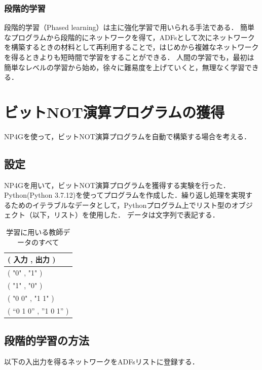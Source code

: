 \documentclass[exploratorypaper]{jsaiart} %
\begin{document}
\subsubsection{段階的学習}
段階的学習（Phased learning）は主に強化学習で用いられる手法である\cite{hodohara2012reinforcement}．
簡単なプログラムから段階的にネットワークを得て，ADFsとして次にネットワークを構築するときの材料として再利用することで，はじめから複雑なネットワークを得るときよりも短時間で学習をすることができる．
人間の学習でも，最初は簡単なレベルの学習から始め，徐々に難易度を上げていくと，無理なく学習できる．

\section{ビットNOT演算プログラムの獲得}
NP4Gを使って，ビットNOT演算プログラムを自動で構築する場合を考える．

\subsection{設定}
NP4Gを用いて，ビットNOT演算プログラムを獲得する実験を行った．
Python(Python 3.7.12)を使ってプログラムを作成した．繰り返し処理を実現するためのイテラブルなデータとして，Pythonプログラム上でリスト型のオブジェクト（以下，リスト）を使用した．
データは文字列で表記する．

\begin{table}[htbp]
\centering
\caption{学習に用いる教師データのすべて}
\label{tbl:result}
\begin{tabular}{l}
    \hline
     ( 入力 , 出力 ) \\
    \hline \hline
    ( "0" , "1" ) \\
    ( "1" , "0" ) \\
    ( "0 0" , "1 1" ) \\
    ( “0 1 0” , ”1 0 1” ) \\
    \hline
\end{tabular}
\end{table}

\subsection{段階的学習の方法}
以下の入出力を得るネットワークをADFsリストに登録する．



\end{document}
